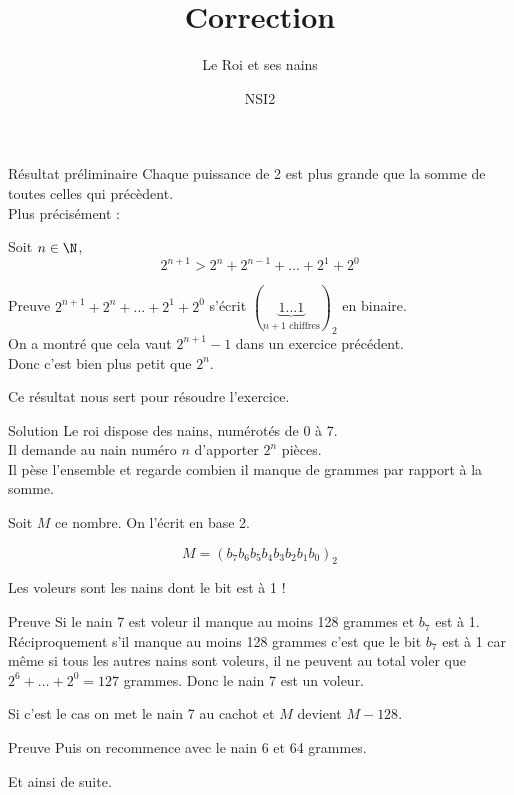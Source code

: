 \documentclass[12pt]{nsibeamer}
\title{Correction}
\subtitle{Le Roi et ses nains}
\author{NSI2}
\begin{document}
	\maketitle

\begin{frame}{Résultat préliminaire}
    \pause
    Chaque puissance de 2 est plus grande que la somme de toutes celles qui précèdent.\pause\\

    Plus précisément :\pause

    Soit $n\in\N$,\pause
    $$2^{n+1} > 2^n + 2^{n-1}+\ldots + 2^1+2^0$$
\end{frame}

\begin{frame}{Preuve}
    $2^{n+1} + 2^{n}+\ldots + 2^1+2^0$ s'écrit $ \left(\underbrace{1\ldots 1}_{n+1\textrm{ chiffres}}\right)_2$ en binaire.\\\pause
    On a montré que cela vaut $2^{n+1}-1$ dans un exercice précédent.\\
    Donc c'est bien plus petit que $2^n$.
\end{frame}

\begin{frame}[standout]
    \Large
    Ce résultat nous sert pour résoudre l'exercice.
\end{frame}
\begin{frame}{Solution}
    \pause
    Le roi dispose des nains, numérotés de 0 à 7.\\\pause
    Il demande au nain numéro $n$ d'apporter $2^n$ pièces.\\\pause
    Il pèse l'ensemble et regarde combien il manque de grammes par rapport à la somme.\\\pause

    Soit $M$ ce nombre. On l'écrit en base 2.\pause

    $$M = (b_7b_6b_5b_4b_3b_2b_1b_0)_2$$\pause

    Les voleurs sont les nains dont le bit est à 1 !
\end{frame}

\begin{frame}{Preuve}
    Si le nain 7 est voleur il manque au moins 128 grammes et $b_7$ est à 1.\\\pause
    Réciproquement s'il manque au moins 128 grammes c'est que le bit $b_7$ est à 1 car même si tous les autres nains sont voleurs, il ne peuvent au total voler que $2^6+\ldots+2^0=127$ grammes. Donc le nain 7 est un voleur.\\\pause 
    
    Si c'est le cas on met le nain 7 au cachot et $M$ devient $M-128$.\\\pause
\end{frame}
\begin{frame}{Preuve}
    Puis on recommence avec le nain 6 et 64 grammes.\\\pause

    Et ainsi de suite. 
\end{frame}
\end{document}

